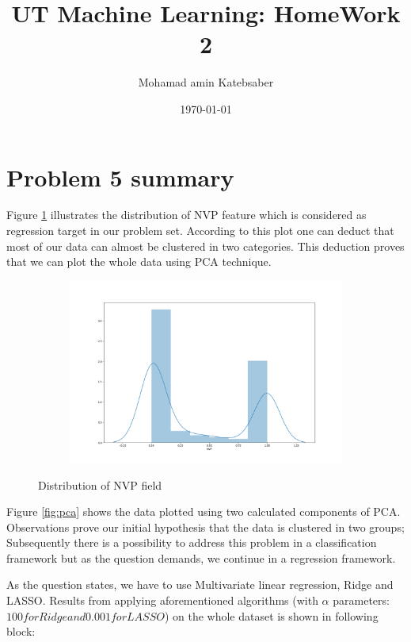 \documentclass[12pt]{article}
\begin{document}
\title{UT Machine Learning: HomeWork 2}
\author{Mohamad amin Katebsaber}
\date{\today}
\maketitle

\section{Problem 5 summary}
Figure \ref{fig:mean_nvp} illustrates the distribution of NVP feature which is considered as regression target in our problem set. According to this plot one can deduct that most of our data can almost be clustered in two categories. This deduction proves that we can plot the whole data using PCA technique.


\begin{figure}[h!]
  \centering
  \begin{subfigure}[b]{0.7\linewidth}
    \includegraphics[width=\linewidth]{./plots/mean_NVP.png}    
  \end{subfigure} 
  \caption{Distribution of NVP field}
  \label{fig:mean_nvp}
\end{figure}


Figure \ref{fig:pca} shows the data plotted using two calculated components of PCA. Observations prove our initial hypothesis that the data is clustered in two groups; Subsequently there is a possibility to address this problem in a classification framework but as the question demands, we continue in a regression framework.

As the question states, we have to use Multivariate linear regression, Ridge and LASSO. Results from applying aforementioned algorithms (with $\alpha$ parameters: $100 for Ridge and 0.001 for LASSO$) on the whole dataset is shown in following block:
\end{document}
